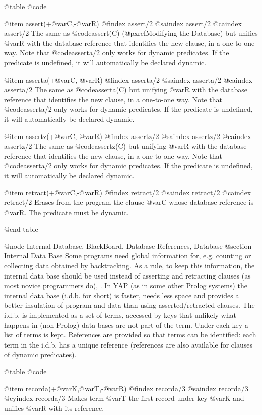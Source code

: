 {{{{{@table @code

@item assert(+@var{C},-@var{R})
@findex assert/2
@saindex assert/2
@caindex assert/2
 The same as @code{assert(C)} (@pxref{Modifying the Database}) but
unifies @var{R} with the  database reference that identifies the new
clause, in a one-to-one way. Note that @code{asserta/2} only works for dynamic
predicates. If the predicate is undefined, it will automatically be
declared dynamic.

@item asserta(+@var{C},-@var{R})
@findex asserta/2
@saindex asserta/2
@caindex asserta/2
 The same as @code{asserta(C)} but unifying @var{R} with
the  database reference that identifies the new clause, in a 
one-to-one way. Note that @code{asserta/2} only works for dynamic
predicates. If the predicate is undefined, it will automatically be
declared dynamic.

@item assertz(+@var{C},-@var{R})
@findex assertz/2
@saindex assertz/2
@caindex assertz/2
 The same as @code{assertz(C)} but unifying @var{R} with
the  database reference that identifies the new clause, in a 
one-to-one way. Note that @code{asserta/2} only works for dynamic
predicates. If the predicate is undefined, it will automatically be
declared dynamic.

@item retract(+@var{C},-@var{R})
@findex retract/2
@saindex retract/2
@caindex retract/2
 Erases from the program the clause @var{C} whose 
database reference is @var{R}. The predicate must be dynamic.


@end table

@node Internal Database, BlackBoard, Database References, Database
@section Internal Data Base
Some programs need global information for, e.g. counting or collecting 
data obtained by backtracking. As a rule, to keep this information, the
internal data base should be used instead of asserting and retracting
clauses (as most novice programmers  do), .
In YAP (as in some other Prolog systems) the internal data base (i.d.b. 
for short) is faster, needs less space and provides a better insulation of 
program and data than using asserted/retracted clauses.
The i.d.b. is implemented as a set of terms, accessed by keys that 
unlikely what happens in (non-Prolog) data bases are not part of the 
term. Under each key a list of terms is kept. References are provided so that 
terms can be identified: each term in the i.d.b. has a unique reference 
(references are also available for clauses of dynamic predicates).

@table @code

@item recorda(+@var{K},@var{T},-@var{R})
@findex recorda/3
@saindex recorda/3
@cyindex recorda/3
Makes term @var{T} the first record under key @var{K} and  unifies @var{R}
with its reference.

}}}}}
